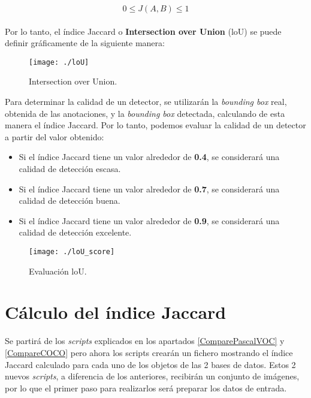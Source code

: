\documentclass[a4paper, 12pt, oneside]{book}
\begin{document}
\begin{equation}
0\leq J(A,B) \leq  1
\end{equation}
\\
Por lo tanto, el índice Jaccard o \textbf{Intersection over Union} (loU) se puede definir gráficamente de la siguiente manera:

\begin{figure}[H]
\begin{center}
\texttt{[image: ./loU]}
\caption{Intersection over Union.}
\label{IntersectionOverUnion}
\end{center}
\end{figure}

Para determinar la calidad de un detector, se utilizarán la \textit{bounding box} real, obtenida de las anotaciones, y la \textit{bounding box} detectada, calculando de esta manera el índice Jaccard. Por lo tanto, podemos evaluar la calidad de un detector a partir del valor obtenido:

\begin{itemize}
\item Si el índice Jaccard tiene un valor alrededor de \textbf{0.4}, se considerará una calidad de detección escasa.
\item Si el índice Jaccard tiene un valor alrededor de \textbf{0.7}, se considerará una calidad de detección buena.
\item Si el índice Jaccard tiene un valor alrededor de \textbf{0.9}, se considerará una calidad de detección excelente.
\end{itemize}

\begin{figure}[H]
\begin{center}
\texttt{[image: ./loU\_score]}
\caption{Evaluación loU.}
\end{center}
\end{figure}


\section{Cálculo del índice Jaccard}

Se partirá de los \textit{scripts} explicados en los apartados \ref{ComparePascalVOC} y \ref{CompareCOCO} pero ahora los scripts crearán un fichero mostrando el índice Jaccard calculado para cada uno de los objetos de las 2 bases de datos. Estos 2 nuevos \textit{scripts}, a diferencia de los anteriores, recibirán un conjunto de imágenes, por lo que el primer paso para realizarlos será preparar los datos de entrada.\\
\end{document}
